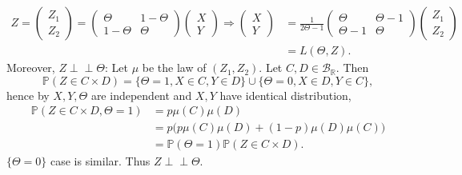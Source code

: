 \documentclass[12pt]{extarticle}
\begin{document}
\begin{equation*}
\begin{aligned}
Z =
\begin{pmatrix}
Z_1\\Z_2
\end{pmatrix}
=
\begin{pmatrix}
\Theta & 1-\Theta\\
1-\Theta & \Theta
\end{pmatrix}
\begin{pmatrix}
X\\Y
\end{pmatrix}
\Rightarrow
\begin{pmatrix}
X\\Y
\end{pmatrix} &=
\frac{1}{2\Theta-1}
\begin{pmatrix}
\Theta & \Theta-1 \\
\Theta-1 & \Theta
\end{pmatrix}
\begin{pmatrix}
Z_1\\Z_2
\end{pmatrix}
\\&
=L(\Theta,Z).
\end{aligned}
\end{equation*}
Moreover, $Z\perp\!\!\!\perp\Theta$: Let $\mu$ be the law of $(Z_1,Z_2)$. Let $C,D\in\mathcal{B}_\mathbb{R}$. Then
\begin{equation*}
\mathbb{P}(Z\in C\times D)=\{\Theta=1,X\in C,Y\in D\}\cup\{\Theta=0,X\in D,Y\in C\},
\end{equation*}
hence by $X,Y,\Theta$ are independent and $X,Y$ have identical distribution,
\begin{equation*}
\begin{aligned}
\mathbb{P}(Z\in C\times D,\Theta=1) &= p\mu(C)\mu(D) \\&
=p\Big(p\mu(C)\mu(D)+(1-p)\mu(D)\mu(C)\Big) \\&
=\mathbb{P}(\Theta=1)\mathbb{P}(Z\in C\times D).
\end{aligned}
\end{equation*}
$\{\Theta=0\}$ case is similar. Thus $Z\perp\!\!\!\perp\Theta$.
\end{document}
